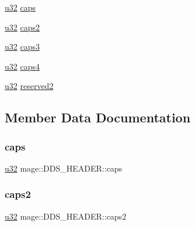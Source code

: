 \begin{DoxyCompactItemize}
\hyperlink{namespacemage_af2b398bf98eb10351f49cad73fe2cc73}{u32} \hyperlink{structmage_1_1_d_d_s___h_e_a_d_e_r_a1134551a99f720ec3d44a28ee9024c1a}{caps}
\item 
\hyperlink{namespacemage_af2b398bf98eb10351f49cad73fe2cc73}{u32} \hyperlink{structmage_1_1_d_d_s___h_e_a_d_e_r_a35f4176320324d1d9c20abf6a15432c9}{caps2}
\item 
\hyperlink{namespacemage_af2b398bf98eb10351f49cad73fe2cc73}{u32} \hyperlink{structmage_1_1_d_d_s___h_e_a_d_e_r_ae2714b17c4fd14bc752cffef4184e90f}{caps3}
\item 
\hyperlink{namespacemage_af2b398bf98eb10351f49cad73fe2cc73}{u32} \hyperlink{structmage_1_1_d_d_s___h_e_a_d_e_r_a5f2aa64bc45ce2b835d486d16c406724}{caps4}
\item 
\hyperlink{namespacemage_af2b398bf98eb10351f49cad73fe2cc73}{u32} \hyperlink{structmage_1_1_d_d_s___h_e_a_d_e_r_a9b425b7d39829de428a82ff7841497c3}{reserved2}
\end{DoxyCompactItemize}


\subsection{Member Data Documentation}
\hypertarget{structmage_1_1_d_d_s___h_e_a_d_e_r_a1134551a99f720ec3d44a28ee9024c1a}{}\label{structmage_1_1_d_d_s___h_e_a_d_e_r_a1134551a99f720ec3d44a28ee9024c1a} 
\subsubsection{\texorpdfstring{caps}{caps}}
{\footnotesize\ttfamily \hyperlink{namespacemage_af2b398bf98eb10351f49cad73fe2cc73}{u32} mage\+::\+D\+D\+S\+\_\+\+H\+E\+A\+D\+E\+R\+::caps}

\hypertarget{structmage_1_1_d_d_s___h_e_a_d_e_r_a35f4176320324d1d9c20abf6a15432c9}{}\label{structmage_1_1_d_d_s___h_e_a_d_e_r_a35f4176320324d1d9c20abf6a15432c9} 
\subsubsection{\texorpdfstring{caps2}{caps2}}
{\footnotesize\ttfamily \hyperlink{namespacemage_af2b398bf98eb10351f49cad73fe2cc73}{u32} mage\+::\+D\+D\+S\+\_\+\+H\+E\+A\+D\+E\+R\+::caps2}

